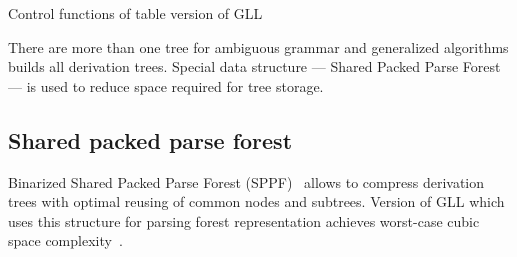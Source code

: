 \begin{algorithm}[h]
\begin{algorithmic}[1]
\caption{Control functions of table version of GLL}
\label{mainTblFunctions}
  \Else
  \EndIf
\EndFunction

       \Else 
       \EndIf
       \EndIf
  \EndCase
       \EndFor
  \EndCase
  \EndCase
  \EndCase
  \EndSwitch
\EndFunction

      \Else
      \EndIf
  \EndWhile
\EndFunction

\end{algorithmic}
\end{algorithm}

There are more than one tree for ambiguous grammar and generalized algorithms builds all derivation trees. Special data structure --- Shared Packed Parse Forest~\cite{SPPF} --- is used to reduce space required for tree storage.


\subsection{Shared packed parse forest}

Binarized Shared Packed Parse Forest (SPPF)~\cite{brnglr} allows to compress derivation trees with optimal reusing of common nodes and subtrees.
Version of GLL which uses this structure for parsing forest representation achieves worst-case cubic space complexity~\cite{gllParsingTree}.

